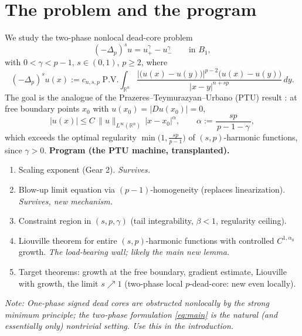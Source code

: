 \documentclass[11pt]{amsart}
\theoremstyle{plain}
\theoremstyle{definition}
\theoremstyle{remark}
\newcommand{\R}{\mathbb{R}}
\newcommand{\fpl}[1]{(-\Delta_p)^{s}#1}            %
\newcommand{\Jp}[1]{|#1|^{p-2}#1}                  %
\newcommand{\al}{\alpha}
\newcommand{\NOTE}[1]{\textcolor{blue!70!black}{\textit{Note: #1}}}
\begin{document}
\section{The problem and the program}
We study the two-phase nonlocal dead-core problem
\begin{equation}\label{eq:main}
  \fpl{u} = u_+^{\gamma} - u_-^{\gamma} \qquad \text{in } B_1,
\end{equation}
with $0<\gamma<p-1$, $s\in(0,1)$, $p\ge 2$, where
\[
  \fpl{u}(x) := c_{n,s,p}\;\mathrm{P.V.}\!\int_{\R^n}
    \frac{\Jp{\big(u(x)-u(y)\big)}}{|x-y|^{n+sp}}\,dy .
\]
The goal is the analogue of the Prazeres--Teymurazyan--Urbano (PTU) result
\cite{PTU}: at free boundary points $x_0$ with $u(x_0)=|Du(x_0)|=0$,
\[
  |u(x)| \le C\,\|u\|_{L^\infty(\R^n)}\,|x-x_0|^{\al},
  \qquad
  \al := \frac{sp}{\,p-1-\gamma\,},
\]
which exceeds the optimal regularity $\min\!\big(1,\tfrac{sp}{p-1}\big)$ of
$(s,p)$-harmonic functions, since $\gamma>0$.
\medskip
\noindent\textbf{Program (the PTU machine, transplanted).}
\begin{enumerate}
  \item[\S\ref{sec:scaling}] Scaling exponent (Gear 2). \emph{Survives.}
  \item[\S\ref{sec:homog}] Blow-up limit equation via $(p-1)$-homogeneity
        (replaces linearization). \emph{Survives, new mechanism.}
  \item[\S\ref{sec:constraints}] Constraint region in $(s,p,\gamma)$
        (tail integrability, $\beta<1$, regularity ceiling).
  \item[\S\ref{sec:liouville}] Liouville theorem for entire
        $(s,p)$-harmonic functions with controlled $C^{1,\al_0}$ growth.
        \emph{The load-bearing wall; likely the main new lemma.}
  \item[\S\ref{sec:targets}] Target theorems: growth at the free boundary,
        gradient estimate, Liouville with growth, the limit $s\nearrow 1$
        (two-phase local $p$-dead-core: new even locally).
\end{enumerate}
\NOTE{One-phase signed dead cores are obstructed nonlocally by the strong
minimum principle; the two-phase formulation \eqref{eq:main} is the natural
(and essentially only) nontrivial setting. Use this in the introduction.}
\end{document}
